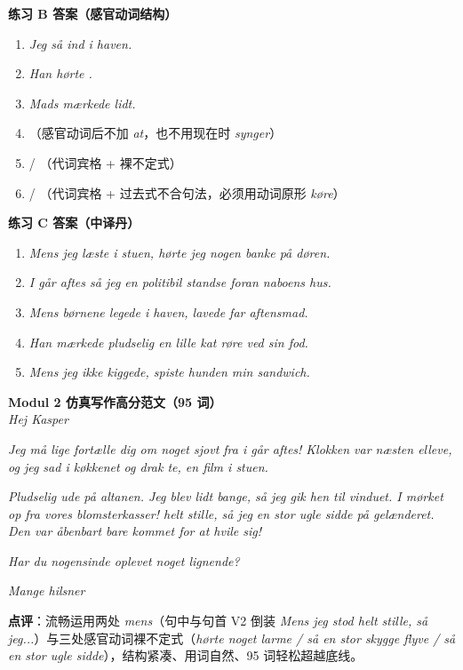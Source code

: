 \begin{answerbox}
\textbf{练习 B 答案（感官动词结构）}
\begin{enumerate}
  \item \textit{Jeg så  ind i haven.}
  \item \textit{Han hørte .}
  \item \textit{Mads mærkede  lidt.}
  \item {}（感官动词后不加 \textit{at}，也不用现在时 \textit{synger}）
  \item {} / （代词宾格 + 裸不定式）
  \item {} / （代词宾格 + 过去式不合句法，必须用动词原形 \textit{køre}）
\end{enumerate}

\textbf{练习 C 答案（中译丹）}
\begin{enumerate}
  \item \textit{Mens jeg læste i stuen, hørte jeg nogen banke på døren.}
  \item \textit{I går aftes så jeg en politibil standse foran naboens hus.}
  \item \textit{Mens børnene legede i haven, lavede far aftensmad.}
  \item \textit{Han mærkede pludselig en lille kat røre ved sin fod.}
  \item \textit{Mens jeg ikke kiggede, spiste hunden min sandwich.}
\end{enumerate}

\textbf{Modul 2 仿真写作高分范文（95 词）}\\
\textit{Hej Kasper}

\textit{Jeg må lige fortælle dig om noget sjovt fra i går aftes! Klokken var næsten elleve, og jeg sad i køkkenet og drak te,  en film i stuen.}

\textit{Pludselig  ude på altanen. Jeg blev lidt bange, så jeg gik hen til vinduet. I mørket  op fra vores blomsterkasser!  helt stille, så jeg en stor ugle sidde på gelænderet. Den var åbenbart bare kommet for at hvile sig!}

\textit{Har du nogensinde oplevet noget lignende?}

\textit{Mange hilsner\\
}

\small\textbf{点评}：流畅运用两处 \textit{mens}（句中与句首 V2 倒装 \textit{Mens jeg stod helt stille, så jeg...}）与三处感官动词裸不定式（\textit{hørte noget larme / så en stor skygge flyve / så en stor ugle sidde}），结构紧凑、用词自然、95 词轻松超越底线。
\end{answerbox}
